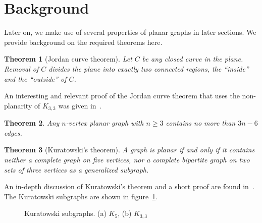 \documentclass[12pt]{article}
\newtheorem{theorem}{Theorem}[section]
\begin{document}
\section{Background}
\label{sec:background}

Later on, we make use of several properties of planar graphs in later sections. We provide background on the required theorems here.\\

\begin{theorem}[Jordan curve theorem]
  Let $C$ be any closed curve in the plane. Removal of $C$ divides the plane into exactly two connected regions, the ``inside'' and the ``outside'' of $C$.
\end{theorem}

An interesting and relevant proof of the Jordan curve theorem that uses the non-planarity of $K_{3,3}$ was given in~\cite{thomassen1992jordan}.\\

\begin{theorem}
  Any $n$-vertex planar graph with $n \geq 3$ contains no more than $3n-6$ edges.\\
\end{theorem}

\begin{theorem}[Kuratowski's theorem]
  A graph is planar if and only if it contains neither a complete graph on five vertices, nor a complete bipartite graph on two sets of three vertices as a generalized subgraph.
\end{theorem}

An in-depth discussion of Kuratowski's theorem and a short proof are found in~\cite{thomassen1981kuratowski}. The Kuratowski subgraphs are shown in figure~\ref{fig:kuratowski}.\\

\begin{figure}[!t]
  \centering
  \hfil
  \caption{Kuratowski subgraphs. (a) $K_5$, (b) $K_{3,3}$}
  \label{fig:kuratowski}
\end{figure}
\end{document}
